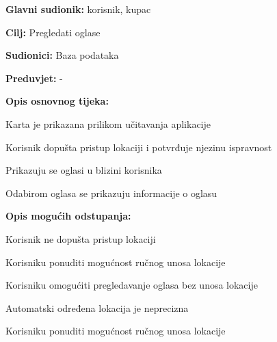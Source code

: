 					\noindent {}
					\begin{packed_item}
						
						\item \textbf{Glavni sudionik: } korisnik, kupac
						\item  \textbf{Cilj:} Pregledati oglase
						\item  \textbf{Sudionici:} Baza podataka
						\item  \textbf{Preduvjet:} -
						\item  \textbf{Opis osnovnog tijeka:}
						
						\item[] \begin{packed_enum}
							
							\item Karta je prikazana prilikom učitavanja aplikacije
							\item Korisnik dopušta pristup lokaciji i potvrđuje njezinu ispravnost
							\item Prikazuju se oglasi u blizini korisnika
							\item Odabirom oglasa se prikazuju informacije o oglasu
						\end{packed_enum}
						
						\item  \textbf{Opis mogućih odstupanja:}
						
						\item[] \begin{packed_item}
							
							\item[2.a] Korisnik ne dopušta pristup lokaciji 
							\item[] \begin{packed_enum}
								
								\item Korisniku ponuditi mogućnost ručnog unosa lokacije
								\item Korisniku omogućiti pregledavanje oglasa bez unosa lokacije
								
							\end{packed_enum}
							\item[2.b] Automatski određena lokacija je neprecizna
							\item[] \begin{packed_enum}
								
								\item Korisniku ponuditi mogućnost ručnog unosa lokacije
								
							\end{packed_enum}
							
						\end{packed_item}
					\end{packed_item}
					
